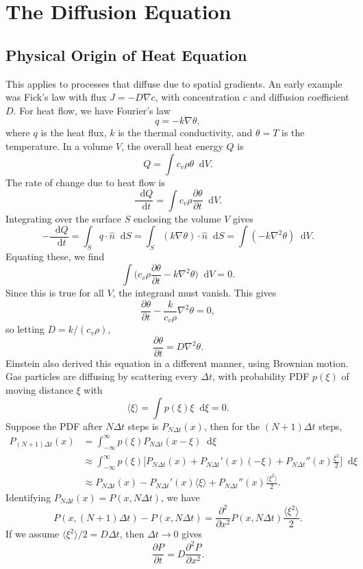 \documentclass[12pt]{article}
\newcommand{\diff}{\mathop{}\!\mathrm{d}}
\theoremstyle{definition}
\theoremstyle{remark}
\begin{document}
\newpage

\section{The Diffusion Equation}%
\label{sec:the_diffusion_equation}

\subsection{Physical Origin of Heat Equation}%
\label{sub:physical_origin_of_heat_equation}

This applies to processes that diffuse due to spatial gradients. An early example was Fick's law with flux $J = - D \nabla c$, with concentration $c$ and diffusion coefficient $D$. For heat flow, we have Fourier's law
\[
q = - k \nabla \theta
,\]
where $q$ is the heat flux, $k$ is the thermal conductivity, and $\theta = T$ is the temperature. In a volume $V$, the overall heat energy $Q$ is
\[
Q = \int c_v \rho \theta \diff V
.\]
The rate of change due to heat flow is
\[
\frac{\diff Q}{\diff t} = \int c_v \rho \frac{\partial \theta}{\partial t} \diff V
.\]
Integrating over the surface $S$ enclosing the volume $V$ gives
\[
	-\frac{\diff Q}{\diff t} = \int_{S} q \cdot \hat n \diff S = \int_{S}(k \nabla \theta) \cdot \hat n \diff S = \int (-k \nabla^2 \theta) \diff V
.\]
Equating these, we find
\[
	\int \biggl( c_v \rho \frac{\partial \theta}{\partial t} - k \nabla^2 \theta \biggr) \diff V = 0
.\]
Since this is true for all $V$, the integrand must vanish. This gives
\[
\frac{\partial \theta}{\partial t} - \frac{k}{c_v \rho} \nabla^2 \theta = 0
,\]
so letting $D = k/(c_v \rho)$,
\[
\frac{\partial \theta}{\partial t} = D \nabla^2 \theta
.\]
Einstein also derived this equation in a different manner, using Brownian motion. Gas particles are diffusing by scattering every $\Delta t$, with probability PDF $p(\xi)$ of moving distance $\xi$ with
\[
	\langle \xi \rangle = \int p(\xi) \xi \diff \xi = 0
.\]
Suppose the PDF after $N \Delta t$ steps is $P_{N \Delta t}(x)$, then for the $(N+1)\Delta t$ steps,
\begin{align*}
	P_{(N+1)\Delta t}(x) &= \int_{-\infty}^{\infty}p(\xi) P_{N \Delta t}(x - \xi) \diff \xi \\
			     &\approx \int_{-\infty}^{\infty}p(\xi) \biggl[ P_{N \Delta t}(x) + P_{N \Delta t}'(x)(-\xi) + P_{N \Delta t}''(x) \frac{\xi^2}{2} \biggr] \diff \xi \\
			     &\approx P_{N \Delta t}(x) - P_{N \Delta t}'(x)\langle \xi \rangle + P_{N \Delta t}''(x) \frac{\langle \xi^2 \rangle}{2}.
\end{align*}
Identifying $P_{N \Delta t}(x) = P(x, N \Delta t)$, we have
\[
	P(x, (N + 1) \Delta t) - P(x, N \Delta t) = \frac{\partial ^2}{\partial x^2} P(x, N \Delta t) \frac{\langle \xi^2 \rangle}{2}
.\]
If we assume $\langle \xi^2 \rangle/2 = D \Delta t$, then $\Delta t \to 0$ gives
\[
\frac{\partial P}{\partial t} = D \frac{\partial^2 P}{\partial x^2}
.\]
\end{document}
